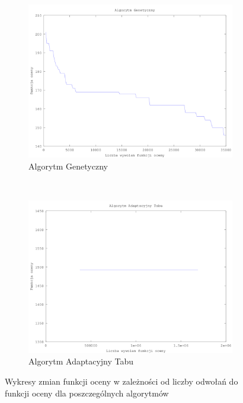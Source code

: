 \begin{figure}[H]
        \centering
\begin{subfigure}[b]{0.5\textwidth}
                \includegraphics[width=\textwidth]{algorytm_genetyczny_szkola.png}
                \caption{Algorytm Genetyczny}
        \end{subfigure}%
        ~ %
        \begin{subfigure}[b]{0.5\textwidth}
                \includegraphics[width=\textwidth]{alg_ats_szkola.png}
                \caption{Algorytm Adaptacyjny Tabu}
        \end{subfigure}
        \caption{Wykresy zmian funkcji oceny w zależności od liczby odwołań do funkcji oceny dla poszczególnych algorytmów}
\end{figure}
